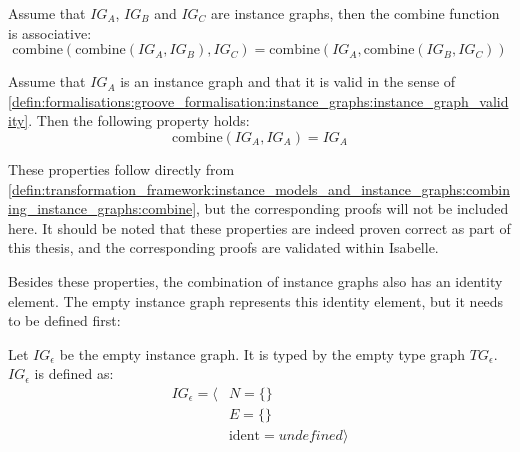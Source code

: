 \begin{thm}
\label{defin:transformation_framework:instance_models_and_instance_graphs:combining_instance_graphs:ig_combine_assoc}
Assume that $IG_A$, $IG_B$ and $IG_C$ are instance graphs, then the $\mathrm{combine}$ function is associative:
\begin{equation*}
    \mathrm{combine}(\mathrm{combine}(IG_A, IG_B), IG_C) = \mathrm{combine}(IG_A, \mathrm{combine}(IG_B, IG_C))
\end{equation*}
\end{thm}

\begin{thm}
\label{defin:transformation_framework:instance_models_and_instance_graphs:combining_instance_graphs:ig_combine_idemp}
Assume that $IG_A$ is an instance graph and that it is valid in the sense of \cref{defin:formalisations:groove_formalisation:instance_graphs:instance_graph_validity}. Then the following property holds:
\begin{equation*}
    \mathrm{combine}(IG_A, IG_A) = IG_A
\end{equation*}
\end{thm}

These properties follow directly from \cref{defin:transformation_framework:instance_models_and_instance_graphs:combining_instance_graphs:combine}, but the corresponding proofs will not be included here. It should be noted that these properties are indeed proven correct as part of this thesis, and the corresponding proofs are validated within Isabelle.

Besides these properties, the combination of instance graphs also has an identity element. The empty instance graph represents this identity element, but it needs to be defined first:

\begin{defin}
\label{defin:transformation_framework:instance_models_and_instance_graphs:combining_instance_graphs:empty_instance_graph}
Let $IG_{\epsilon}$ be the empty instance graph. It is typed by the empty type graph $TG_{\epsilon}$. $IG_{\epsilon}$ is defined as:
\begin{align*}
IG_{\epsilon} = \langle&
N = \{\} \\&
E = \{\} \\&
\mathrm{ident} = undefined\rangle
\end{align*}
\end{defin}

